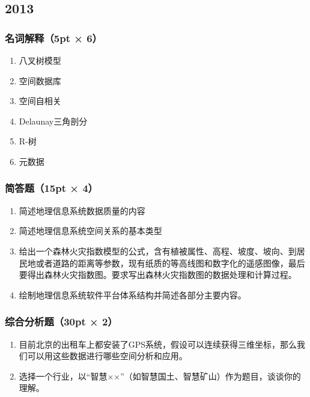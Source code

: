 \documentclass[]{article}
\begin{document}
\hypertarget{header-n458}{%
\subsection{2013}\label{header-n458}}

\hypertarget{header-n459}{%
\subsubsection{名词解释（5pt × 6）}\label{header-n459}}

\begin{enumerate}
\def\labelenumi{\arabic{enumi}.}
\item
  八叉树模型
\item
  空间数据库
\item
  空间自相关
\item
  Delaunay三角剖分
\item
  R-树
\item
  元数据
\end{enumerate}

\hypertarget{header-n473}{%
\subsubsection{简答题（15pt × 4）}\label{header-n473}}

\begin{enumerate}
\def\labelenumi{\arabic{enumi}.}
\item
  简述地理信息系统数据质量的内容
\item
  简述地理信息系统空间关系的基本类型
\item
  给出一个森林火灾指数模型的公式，含有植被属性、高程、坡度、坡向、到居民地或者道路的距离等参数，现有纸质的等高线图和数字化的遥感图像，最后要得出森林火灾指数图。要求写出森林火灾指数图的数据处理和计算过程。
\item
  绘制地理信息系统软件平台体系结构并简述各部分主要内容。
\end{enumerate}

\hypertarget{header-n483}{%
\subsubsection{综合分析题（30pt × 2）}\label{header-n483}}

\begin{enumerate}
\def\labelenumi{\arabic{enumi}.}
\item
  目前北京的出租车上都安装了GPS系统，假设可以连续获得三维坐标，那么我们可以用这些数据进行哪些空间分析和应用。
\item
  选择一个行业，以``智慧××''（如智慧国土、智慧矿山）作为题目，谈谈你的理解。
\end{enumerate}
\end{document}
